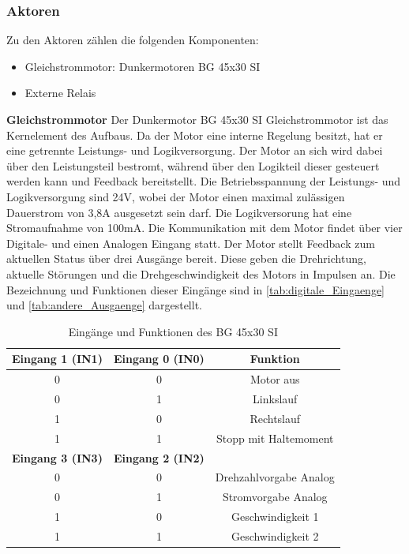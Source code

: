 \subsubsection{Aktoren}
Zu den Aktoren zählen die folgenden Komponenten:
\begin{itemize}
	\item Gleichstrommotor: Dunkermotoren BG 45x30 SI
	\item Externe Relais
\end{itemize}

\noindent\textbf{Gleichstrommotor}\newline
Der Dunkermotor BG 45x30 SI Gleichstrommotor ist das Kernelement des Aufbaus. Da der Motor eine interne Regelung besitzt, hat er eine getrennte Leistungs- und Logikversorgung. Der Motor an sich wird dabei über den Leistungsteil bestromt, während über den Logikteil dieser gesteuert werden kann und Feedback bereitstellt. Die Betriebsspannung der Leistungs- und Logikversorgung sind 24V, wobei der Motor einen maximal zulässigen Dauerstrom von 3,8A ausgesetzt sein darf. Die Logikversorung hat eine Stromaufnahme von 100mA. Die Kommunikation mit dem Motor findet über vier Digitale- und einen Analogen Eingang statt. Der Motor stellt Feedback zum aktuellen Status über drei Ausgänge bereit. Diese geben die Drehrichtung, aktuelle Störungen und die Drehgeschwindigkeit des Motors in Impulsen an. Die Bezeichnung und Funktionen dieser Eingänge sind in \autoref{tab:digitale_Eingaenge} und \autoref{tab:andere_Ausgaenge} dargestellt.\\
\begin{table}[H]
	\centering
		\begin{tabular}{|c|c|c|}
			\hline
			\textbf{Eingang 1 (IN1)} & \textbf{Eingang 0 (IN0)} & \textbf{Funktion}      \\ \hline
			0                        & 0                        & Motor aus              \\ \hline
			0                        & 1                        & Linkslauf              \\ \hline
			1                        & 0                        & Rechtslauf             \\ \hline
			1                        & 1                        & Stopp mit Haltemoment  \\ \hline
			\textbf{Eingang 3 (IN3)} & \textbf{Eingang 2 (IN2)} &                        \\ \hline
			0                        & 0                        & Drehzahlvorgabe Analog \\ \hline
			0                        & 1                        & Stromvorgabe Analog    \\ \hline
			1                        & 0                        & Geschwindigkeit 1      \\ \hline
			1                        & 1                        & Geschwindigkeit 2      \\ \hline
		\end{tabular}%
	\caption{Eingänge und Funktionen des BG 45x30 SI}
	\label{tab:digitale_Eingaenge}
\end{table}
